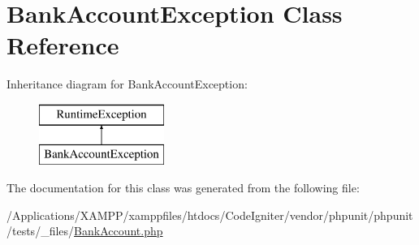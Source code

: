 \hypertarget{class_bank_account_exception}{}\section{Bank\+Account\+Exception Class Reference}
\label{class_bank_account_exception}
Inheritance diagram for Bank\+Account\+Exception\+:\begin{figure}[H]
\begin{center}
\leavevmode
\includegraphics[height=2.000000cm]{class_bank_account_exception}
\end{center}
\end{figure}


The documentation for this class was generated from the following file\+:\begin{DoxyCompactItemize}
\item 
/\+Applications/\+X\+A\+M\+P\+P/xamppfiles/htdocs/\+Code\+Igniter/vendor/phpunit/phpunit/tests/\+\_\+files/\mbox{\hyperlink{phpunit_2tests_2__files_2_bank_account_8php}{Bank\+Account.\+php}}\end{DoxyCompactItemize}
